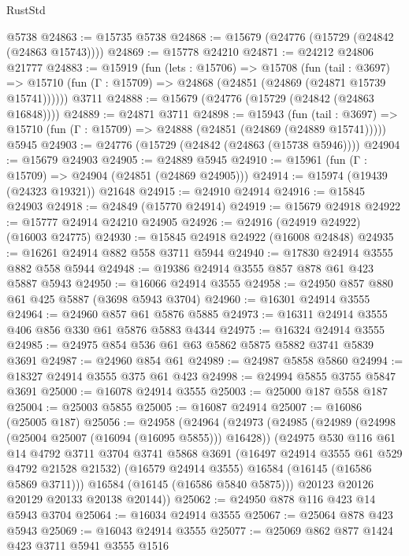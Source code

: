 \begin{lexlean}{RustStd}
\begin{coremodule}
    @5738
@24863 := @15735 @5738
@24868 := @15679 (@24776 (@15729 (@24842 (@24863 @15743))))
@24869 := @15778 @24210
@24871 := @24212 @24806 @21777
@24883 := @15919
    (fun (lets : @15706) =>
    @15708
      (fun (tail : @3697) =>
      @15710 (fun (Γ : @15709) => @24868 (@24851 (@24869 (@24871 @15739 @15741))))))
    @3711
@24888 := @15679 (@24776 (@15729 (@24842 (@24863 @16848))))
@24889 := @24871 @3711
@24898 := @15943
    (fun (tail : @3697) => @15710 (fun (Γ : @15709) => @24888 (@24851 (@24869 (@24889 @15741)))))
    @5945
@24903 := @24776 (@15729 (@24842 (@24863 (@15738 @5946))))
@24904 := @15679 @24903
@24905 := @24889 @5945
@24910 := @15961 (fun (Γ : @15709) => @24904 (@24851 (@24869 @24905)))
@24914 := @15974 (@19439 (@24323 @19321)) @21648
@24915 := @24910 @24914
@24916 := @15845 @24903
@24918 := @24849 (@15770 @24914)
@24919 := @15679 @24918
@24922 := @15777 @24914 @24210 @24905
@24926 := @24916 (@24919 @24922) (@16003 @24775)
@24930 := @15845 @24918 @24922 (@16008 @24848)
@24935 := @16261 @24914 @882 @558 @3711 @5944
@24940 := @17830 @24914 @3555 @882 @558 @5944
@24948 := @19386 @24914 @3555 @857 @878 @61 @423 @5887 @5943
@24950 := @16066 @24914 @3555
@24958 := @24950 @857 @880 @61 @425 @5887 (@3698 @5943 @3704)
@24960 := @16301 @24914 @3555
@24964 := @24960 @857 @61 @5876 @5885
@24973 := @16311 @24914 @3555 @406 @856 @330 @61 @5876 @5883 @4344
@24975 := @16324 @24914 @3555
@24985 := @24975 @854 @536 @61 @63 @5862 @5875 @5882 @3741 @5839 @3691
@24987 := @24960 @854 @61
@24989 := @24987 @5858 @5860
@24994 := @18327 @24914 @3555 @375 @61 @423
@24998 := @24994 @5855 @3755 @5847 @3691
@25000 := @16078 @24914 @3555
@25003 := @25000 @187 @558 @187
@25004 := @25003 @5855
@25005 := @16087 @24914
@25007 := @16086 (@25005 @187)
@25056 := @24958
    (@24964
      (@24973
        (@24985
          (@24989 (@24998 (@25004 @25007 (@16094 (@16095 @5855))) @16428))
          (@24975
            @530
            @116
            @61
            @14
            @4792
            @3711
            @3704
            @3741
            @5868
            @3691
            (@16497 @24914 @3555 @61 @529 @4792 @21528 @21532)
            (@16579 @24914 @3555)
            @16584
            (@16145 (@16586 @5869 @3711)))
          @16584
          (@16145 (@16586 @5840 @5875)))
        @20123
        @20126
        @20129
        @20133
        @20138
        @20144))
@25062 := @24950 @878 @116 @423 @14 @5943 @3704
@25064 := @16034 @24914 @3555
@25067 := @25064 @878 @423 @5943
@25069 := @16043 @24914 @3555
@25077 := @25069 @862 @877 @1424 @423 @3711 @5941 @3555 @1516

\end{coremodule}
\end{lexlean}
